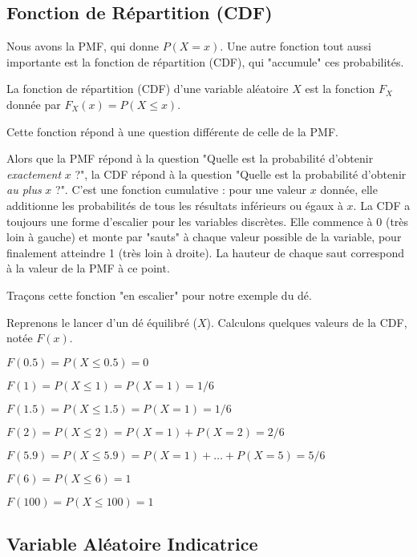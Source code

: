 \subsection{Fonction de Répartition (CDF)}

Nous avons la PMF, qui donne $P(X=x)$. Une autre fonction tout aussi importante est la fonction de répartition (CDF), qui "accumule" ces probabilités.

\begin{definitionbox}
La fonction de répartition (CDF) d'une variable aléatoire $X$ est la fonction $F_X$ donnée par $F_X(x) = P(X \le x)$.
\end{definitionbox}

Cette fonction répond à une question différente de celle de la PMF.

\begin{intuitionbox}
Alors que la PMF répond à la question "Quelle est la probabilité d'obtenir \textit{exactement} $x$ ?", la CDF répond à la question "Quelle est la probabilité d'obtenir \textit{au plus} $x$ ?". C'est une fonction cumulative : pour une valeur $x$ donnée, elle additionne les probabilités de tous les résultats inférieurs ou égaux à $x$.
La CDF a toujours une forme d'escalier pour les variables discrètes. Elle commence à 0 (très loin à gauche) et monte par "sauts" à chaque valeur possible de la variable, pour finalement atteindre 1 (très loin à droite). La hauteur de chaque saut correspond à la valeur de la PMF à ce point.
\end{intuitionbox}

Traçons cette fonction "en escalier" pour notre exemple du dé.

\begin{examplebox}
Reprenons le lancer d'un dé équilibré ($X$). Calculons quelques valeurs de la CDF, notée $F(x)$.

$F(0.5) = P(X \le 0.5) = 0$

$F(1) = P(X \le 1) = P(X=1) = 1/6$

$F(1.5) = P(X \le 1.5) = P(X=1) = 1/6$

$F(2) = P(X \le 2) = P(X=1) + P(X=2) = 2/6$

$F(5.9) = P(X \le 5.9) = P(X=1) + \dots + P(X=5) = 5/6$

$F(6) = P(X \le 6) = 1$

$F(100) = P(X \le 100) = 1$
\end{examplebox}

\subsection{Variable Aléatoire Indicatrice}


